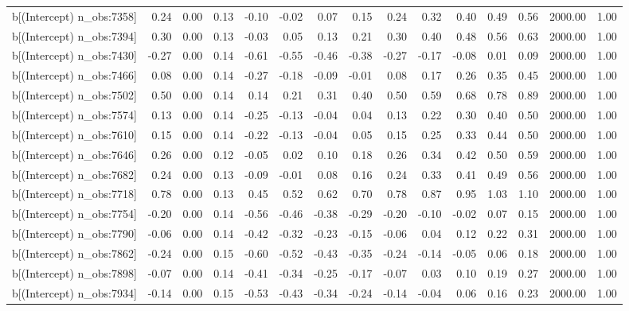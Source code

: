 \begin{table}[ht]
\begin{tabular}{rrrrrrrrrrrrrrr}
  b[(Intercept) n\_obs:7358] & 0.24 & 0.00 & 0.13 & -0.10 & -0.02 & 0.07 & 0.15 & 0.24 & 0.32 & 0.40 & 0.49 & 0.56 & 2000.00 & 1.00 \\ 
  b[(Intercept) n\_obs:7394] & 0.30 & 0.00 & 0.13 & -0.03 & 0.05 & 0.13 & 0.21 & 0.30 & 0.40 & 0.48 & 0.56 & 0.63 & 2000.00 & 1.00 \\ 
  b[(Intercept) n\_obs:7430] & -0.27 & 0.00 & 0.14 & -0.61 & -0.55 & -0.46 & -0.38 & -0.27 & -0.17 & -0.08 & 0.01 & 0.09 & 2000.00 & 1.00 \\ 
  b[(Intercept) n\_obs:7466] & 0.08 & 0.00 & 0.14 & -0.27 & -0.18 & -0.09 & -0.01 & 0.08 & 0.17 & 0.26 & 0.35 & 0.45 & 2000.00 & 1.00 \\ 
  b[(Intercept) n\_obs:7502] & 0.50 & 0.00 & 0.14 & 0.14 & 0.21 & 0.31 & 0.40 & 0.50 & 0.59 & 0.68 & 0.78 & 0.89 & 2000.00 & 1.00 \\ 
  b[(Intercept) n\_obs:7574] & 0.13 & 0.00 & 0.14 & -0.25 & -0.13 & -0.04 & 0.04 & 0.13 & 0.22 & 0.30 & 0.40 & 0.50 & 2000.00 & 1.00 \\ 
  b[(Intercept) n\_obs:7610] & 0.15 & 0.00 & 0.14 & -0.22 & -0.13 & -0.04 & 0.05 & 0.15 & 0.25 & 0.33 & 0.44 & 0.50 & 2000.00 & 1.00 \\ 
  b[(Intercept) n\_obs:7646] & 0.26 & 0.00 & 0.12 & -0.05 & 0.02 & 0.10 & 0.18 & 0.26 & 0.34 & 0.42 & 0.50 & 0.59 & 2000.00 & 1.00 \\ 
  b[(Intercept) n\_obs:7682] & 0.24 & 0.00 & 0.13 & -0.09 & -0.01 & 0.08 & 0.16 & 0.24 & 0.33 & 0.41 & 0.49 & 0.56 & 2000.00 & 1.00 \\ 
  b[(Intercept) n\_obs:7718] & 0.78 & 0.00 & 0.13 & 0.45 & 0.52 & 0.62 & 0.70 & 0.78 & 0.87 & 0.95 & 1.03 & 1.10 & 2000.00 & 1.00 \\ 
  b[(Intercept) n\_obs:7754] & -0.20 & 0.00 & 0.14 & -0.56 & -0.46 & -0.38 & -0.29 & -0.20 & -0.10 & -0.02 & 0.07 & 0.15 & 2000.00 & 1.00 \\ 
  b[(Intercept) n\_obs:7790] & -0.06 & 0.00 & 0.14 & -0.42 & -0.32 & -0.23 & -0.15 & -0.06 & 0.04 & 0.12 & 0.22 & 0.31 & 2000.00 & 1.00 \\ 
  b[(Intercept) n\_obs:7862] & -0.24 & 0.00 & 0.15 & -0.60 & -0.52 & -0.43 & -0.35 & -0.24 & -0.14 & -0.05 & 0.06 & 0.18 & 2000.00 & 1.00 \\ 
  b[(Intercept) n\_obs:7898] & -0.07 & 0.00 & 0.14 & -0.41 & -0.34 & -0.25 & -0.17 & -0.07 & 0.03 & 0.10 & 0.19 & 0.27 & 2000.00 & 1.00 \\ 
  b[(Intercept) n\_obs:7934] & -0.14 & 0.00 & 0.15 & -0.53 & -0.43 & -0.34 & -0.24 & -0.14 & -0.04 & 0.06 & 0.16 & 0.23 & 2000.00 & 1.00 \\ 

\end{tabular}
\end{table}
